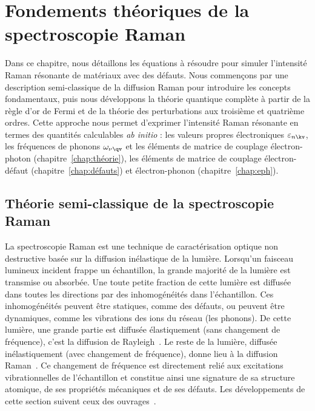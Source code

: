 \chapter{Fondements théoriques de la spectroscopie Raman}\label{chap:Raman}
Dans ce chapitre, nous détaillons les équations à résoudre pour simuler l'intensité Raman résonante de matériaux avec des défauts. Nous commençons par une description semi-classique de la diffusion Raman pour introduire les concepts fondamentaux, puis nous développons la théorie quantique complète à partir de la règle d'or de Fermi et de la théorie des perturbations aux troisième et quatrième ordres. Cette approche nous permet d'exprimer l'intensité Raman résonante en termes des quantités calculables \textit{ab initio} : les valeurs propres électroniques $\varepsilon_{n\kv}$, les fréquences de phonons $\omega_{\nu\qv}$ et les éléments de matrice de couplage électron-photon (chapitre~\ref{chap:théorie}), les éléments de matrice de couplage électron-défaut (chapitre~\ref{chap:défauts}) et électron-phonon (chapitre~\ref{chap:eph}). 

\section{Théorie semi-classique de la spectroscopie Raman}\label{sec:raman_classique}
La spectroscopie Raman est une technique de caractérisation optique non destructive basée sur la diffusion inélastique de la lumière. Lorsqu'un faisceau lumineux incident frappe un échantillon, la grande majorité de la lumière est transmise ou absorbée. Une toute petite fraction de cette lumière est diffusée dans toutes les directions par des inhomogénéités dans l'échantillon. Ces inhomogénéités peuvent être statiques, comme des défauts, ou peuvent être dynamiques, comme les vibrations des ions du réseau (les phonons). De cette lumière, une grande partie est diffusée élastiquement (sans changement de fréquence), c'est la diffusion de Rayleigh~\cite{RayleighLightSky}. Le reste de la lumière, diffusée inélastiquement (avec changement de fréquence), donne lieu à la diffusion Raman~\cite{ramanNewTypeSecondary1928}. Ce changement de fréquence est directement relié aux excitations vibrationnelles de l'échantillon et constitue ainsi une signature de sa structure atomique, de ses propriétés mécaniques et de ses défauts. Les développements de cette section suivent ceux des ouvrages~\cite{yuFundamentalsSemiconductorsPhysics2010,cardonaLightScatteringSolids1982,cardonaLightScatteringSolids1983,SymmetrySpectroscopy}.

